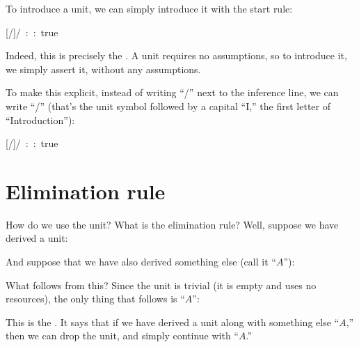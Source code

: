 \documentclass[../../../main.tex]{subfiles}
\begin{document}
To introduce a unit, we can simply introduce it with the start rule:

\begin{prooftree*}
  \hypo{}
  [\startrule/]{\unit/ :: true}
\end{prooftree*}

\noindent
Indeed, this is precisely the . A unit requires no assumptions, so to introduce it, we simply assert it, without any assumptions. 

To make this explicit, instead of writing ``\startrule/'' next to the inference line, we can write ``\unitIntro/'' (that's the unit symbol followed by a capital ``I,'' the first letter of ``Introduction''):

\begin{prooftree*}
  \hypo{}
  [\unitIntro/]{\unit/ :: true}
\end{prooftree*}


\section{Elimination rule}

How do we use the unit? What is the elimination rule? Well, suppose we have derived a unit:

\begin{prooftree*}
  \hypo{}
\end{prooftree*}

\noindent
And suppose that we have also derived something else (call it ``$A$''):

\begin{prooftree*}
  \hypo{}
  \hypo{}
\end{prooftree*}

\noindent
What follows from this? Since the unit is trivial (it is empty and uses no resources), the only thing that follows is ``$A$'':

\begin{prooftree*}
  \hypo{}
  \hypo{}
\end{prooftree*}

\noindent
This is the . It says that if we have derived a unit along with something else ``$A$,'' then we can drop the unit, and simply continue with ``$A$.''
\end{document}
